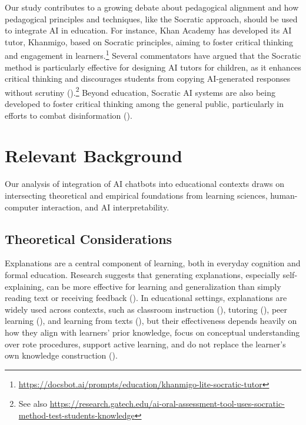 \documentclass[
  11pt,
]{article}
\begin{document}
Our study contributes to a growing debate about pedagogical alignment and how pedagogical principles and techniques, like the Socratic approach, should be used to integrate AI in education. For instance, Khan Academy has developed its AI tutor, Khanmigo, based on Socratic principles, aiming to foster critical thinking and engagement in learners.\footnote{\url{https://docsbot.ai/prompts/education/khanmigo-lite-socratic-tutor}} Several commentators have argued that the Socratic method is particularly effective for designing AI tutors for children, as it enhances critical thinking and discourages students from copying AI-generated responses without scrutiny ().\footnote{See also \url{https://research.gatech.edu/ai-oral-assessment-tool-uses-socratic-method-test-students-knowledge}} Beyond education, Socratic AI systems are also being developed to foster critical thinking among the general public, particularly in efforts to combat disinformation ().

\section{Relevant Background}\label{relevant-background}

Our analysis of integration of AI chatbots into educational contexts draws on intersecting theoretical and empirical foundations from learning sciences, human-computer interaction, and AI interpretability.

\subsection{Theoretical Considerations}\label{theoretical-considerations}

Explanations are a central component of learning, both in everyday cognition and formal education. Research suggests that generating explanations, especially self-explaining, can be more effective for learning and generalization than simply reading text or receiving feedback (). In educational settings, explanations are widely used across contexts, such as classroom instruction (), tutoring (), peer learning (), and learning from texts (), but their effectiveness depends heavily on how they align with learners' prior knowledge, focus on conceptual understanding over rote procedures, support active learning, and do not replace the learner's own knowledge construction ().
\end{document}
